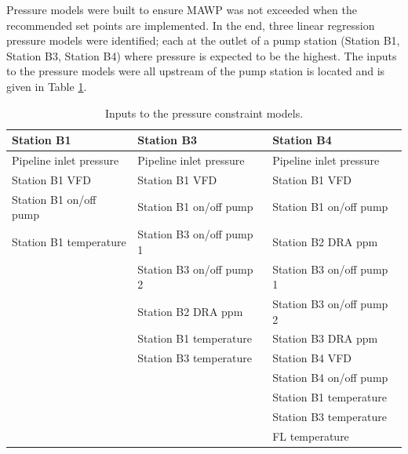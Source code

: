 Pressure models were built to ensure MAWP was not exceeded when the recommended set points are implemented. In the end, three linear regression pressure models were identified; each at the outlet of a pump station (Station B1, Station B3, Station B4) where pressure is expected to be the highest. The inputs to the pressure models were all upstream of the pump station is located and is given in Table \ref{tab:08pressure_inputs}.

\begin{table}[]
    \centering
    {
    \begin{tabular}{p{5cm} | p{5cm} | p{5cm}}
         Station B1 & Station B3 & Station B4 \\
         \hline
         
         Pipeline inlet pressure & Pipeline inlet pressure & Pipeline inlet pressure \\
         
         Station B1 VFD & Station B1 VFD & Station B1 VFD \\
         
         Station B1 on/off pump & Station B1 on/off pump & Station B1 on/off pump \\
         
         Station B1 temperature & Station B3 on/off pump 1 & Station B2 DRA ppm \\
         
         & Station B3 on/off pump 2 & Station B3 on/off pump 1 \\
         
         & Station B2 DRA ppm & Station B3 on/off pump 2 \\
         
         & Station B1 temperature & Station B3 DRA ppm \\
         
         & Station B3 temperature & Station B4 VFD \\
         & & Station B4 on/off pump \\
         & & Station B1 temperature \\
         & & Station B3 temperature \\
         & & FL temperature \\
    \end{tabular}}
    \caption{Inputs to the pressure constraint models.}
    \label{tab:08pressure_inputs}
\end{table}

